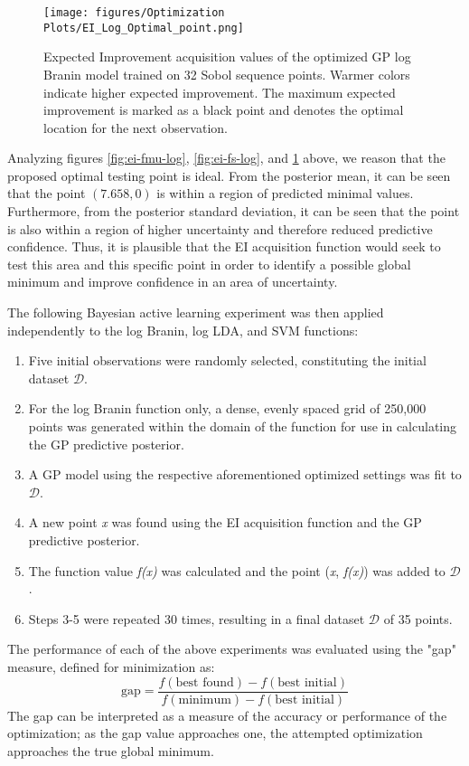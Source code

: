 \documentclass[11pt]{article}
\numberwithin{equation}{section}
\begin{document}
\begin{figure}[H]
  \centering
  \texttt{[image: figures/Optimization Plots/EI\_Log\_Optimal\_point.png]}
  \caption{Expected Improvement acquisition values of the optimized GP log Branin model trained on 32 Sobol sequence points. Warmer colors indicate higher expected improvement. The maximum expected improvement is marked as a black point and denotes the optimal location for the next observation.}
  \label{fig:ei-optimalPoint-log}
\end{figure}

Analyzing figures \ref{fig:ei-fmu-log}, \ref{fig:ei-fs-log}, and \ref{fig:ei-optimalPoint-log} above, we reason that the proposed optimal testing point is ideal. From the posterior mean, it can be seen that the point $(7.658, 0)$ is within a region of predicted minimal values. Furthermore, from the posterior standard deviation, it can be seen that the point is also within a region of higher uncertainty and therefore reduced predictive confidence. Thus, it is plausible that the EI acquisition function would seek to test this area and this specific point in order to identify a possible global minimum and improve confidence in an area of uncertainty. 

The following Bayesian active learning experiment was then applied independently to the log Branin, log LDA, and SVM functions:
\begin{enumerate}
  \item Five initial observations were randomly selected, constituting the initial dataset $\mathcal{D}$.
  \item For the log Branin function only, a dense, evenly spaced grid of 250,000 points was generated within the domain of the function for use in calculating the GP predictive posterior.
  \item A GP model using the respective aforementioned optimized settings was fit to $\mathcal{D}$.
  \item A new point \emph{x} was found using the EI acquisition function and the GP predictive posterior.
  \item The function value \emph{f(x)} was calculated and the point (\emph{x}, \emph{f(x)}) was added to $\mathcal{D}$.
  \item Steps 3-5 were repeated 30 times, resulting in a final dataset $\mathcal{D}$ of 35 points.
\end{enumerate}

The performance of each of the above experiments was evaluated using the "gap" measure, defined for minimization as:
\begin{equation}
  \text{gap} = \dfrac{f(\text{best found}) - f(\text{best initial})}{f(\text{minimum}) - f(\text{best initial})}
  \label{eq:gap}
\end{equation}
The gap can be interpreted as a measure of the accuracy or performance of the optimization; as the gap value approaches one, the attempted optimization approaches the true global minimum. 
\end{document}
